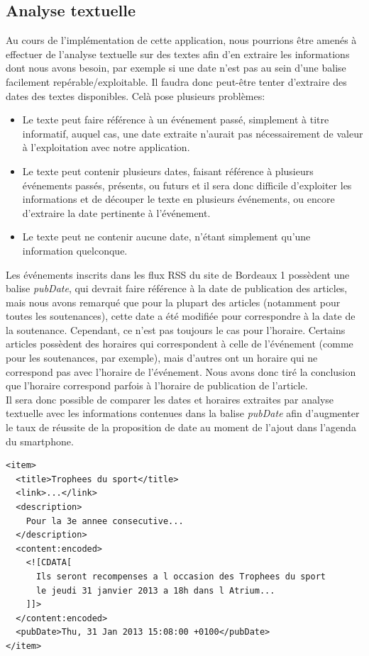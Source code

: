 \documentclass [pdftex,12pt] {report}
\def\wl{\par \vspace{\baselineskip}}
\begin{document}
\subsection{Analyse textuelle}
Au cours de l'implémentation de cette application, nous pourrions être amenés à effectuer de l'analyse textuelle sur des textes afin d'en extraire les informations dont nous avons besoin, par exemple si une date n'est pas au sein d'une balise facilement repérable/exploitable. Il faudra donc peut-être tenter d'extraire des dates des textes disponibles. Celà pose plusieurs problèmes:
\begin{itemize}
\renewcommand{\labelitemi}{$\bullet$}
  \item Le texte peut faire référence à un événement passé, simplement à titre informatif, auquel cas, une date extraite n'aurait pas nécessairement de valeur à l'exploitation avec notre application.
  \item Le texte peut contenir plusieurs dates, faisant référence à plusieurs événements passés, présents, ou futurs et il sera donc difficile d'exploiter les informations et de découper le texte en plusieurs événements, ou encore d'extraire la date pertinente à l'événement.
  \item Le texte peut ne contenir aucune date, n'étant simplement qu'une information quelconque.
\end{itemize}
\wl Les événements inscrits dans les flux RSS du site de Bordeaux 1 possèdent une balise \emph{pubDate}, qui devrait faire référence à la date de publication des articles, mais nous avons remarqué que pour la plupart des articles (notamment pour toutes les soutenances), cette date a été modifiée pour correspondre à la date de la soutenance. Cependant, ce n'est pas toujours le cas pour l'horaire. Certains articles possèdent des horaires qui correspondent à celle de l'événement (comme pour les soutenances, par exemple), mais d'autres ont un horaire qui ne correspond pas avec l'horaire de l'événement. Nous avons donc tiré la conclusion que l'horaire correspond parfois à l'horaire de publication de l'article. \\
Il sera donc possible de comparer les dates et horaires extraites par analyse textuelle avec les informations contenues dans la balise \emph{pubDate} afin d'augmenter le taux de réussite de la proposition de date au moment de l'ajout dans l'agenda du smartphone. \\

\lstset{language=XML}
\begin{lstlisting}[frame=single, caption=Extrait d'un flux RSS de Bordeaux1 (29/01/2013), label=xml1]
<item>
  <title>Trophees du sport</title>
  <link>...</link>
  <description>
	Pour la 3e annee consecutive...
  </description>
  <content:encoded>
    <![CDATA[
      Ils seront recompenses a l occasion des Trophees du sport
      le jeudi 31 janvier 2013 a 18h dans l Atrium...
    ]]>
  </content:encoded>	
  <pubDate>Thu, 31 Jan 2013 15:08:00 +0100</pubDate>
</item>
\end{lstlisting}
\end{document}
